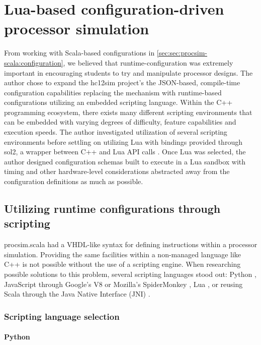 \chapter{Lua-based configuration-driven processor simulation}
\label{ch:lua}

\newcommand{\luainline}[1]{\texttt{#1}}

 From working with Scala-based configurations in \cref{sec:sec:procsim-scala:configuration}, we believed that runtime-configuration was extremely important in encouraging students to try and manipulate processor designs. The author chose to expand the hc12sim project's the JSON-based, compile-time configuration capabilities replacing the mechanism with runtime-based configurations utilizing an embedded scripting language. Within the C++ programming ecosystem, there exists many different scripting environments that can be embedded with varying degrees of difficulty, feature capabilities and execution speeds. The author investigated utilization of several scripting environments before settling on utilizing Lua \cite{Lua:Homepage} with bindings provided through sol2, a wrapper between C++ and Lua API calls \cite{GitHub:ThePhD:sol2}. Once Lua was selected, the author designed configuration schemas built to execute in a Lua sandbox with timing and other hardware-level considerations abstracted away from the configuration definitions as much as possible.

\section{Utilizing runtime configurations through scripting}

procsim.scala had a VHDL-like syntax for defining instructions within a processor simulation. Providing the same facilities within a non-managed language like C++ is not possible without the use of a scripting engine. When researching possible solutions to this problem, several scripting languages stood out: Python \cite{Python:Homepage}, JavaScript through Google's V8 \cite{Google:V8} or Mozilla's SpiderMonkey \cite{MDN:SpiderMonkey}, Lua \cite{Lua:Homepage}, or reusing Scala through the Java Native Interface (JNI) \cite{Oracle:JNI}.

\subsection{Scripting language selection}

\subsubsection{Python} 

